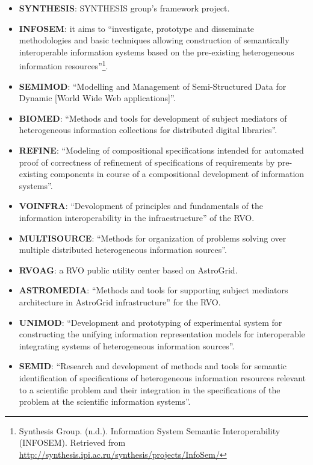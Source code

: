 \begin{itemize}
\item \textbf{SYNTHESIS}:
SYNTHESIS group's framework project.

\item \textbf{INFOSEM}:
it aims to ``investigate, prototype and disseminate methodologies and basic
techniques allowing construction of semantically interoperable information
systems based on the pre-existing heterogeneous information
resources''\footnote{Synthesis Group. (n.d.). Information System Semantic
Interoperability (INFOSEM). Retrieved from
\url{http://synthesis.ipi.ac.ru/synthesis/projects/InfoSem/}}.

\item \textbf{SEMIMOD}:
``Modelling and Management of Semi-Structured Data for Dynamic [World Wide Web
applications]''.

\item \textbf{BIOMED}:
``Methods and tools for development of subject mediators of
he\-te\-ro\-ge\-neous information collections for distributed digital
libraries''.

\item \textbf{REFINE}:
``Modeling of compositional specifications intended for automated proof of
correctness of refinement of specifications of requirements by pre-existing
components in course of a compositional development of information systems''.

\item \textbf{VOINFRA}:
``Devolopment of principles and fundamentals of the information interoperability
in the infraestructure'' of the RVO.

\item \textbf{MULTISOURCE}:
``Methods for organization of problems solving over multiple distributed
heterogeneous information sources''.

\item \textbf{RVOAG}:
a RVO public utility center based on AstroGrid.

\item \textbf{ASTROMEDIA}:
``Methods and tools for supporting subject mediators architecture in AstroGrid
infrastructure'' for the RVO.

\item \textbf{UNIMOD}:
``Development and prototyping of experimental system for constructing the
unifying information representation models for interoperable integrating systems
of heterogeneous information sources''.

\item \textbf{SEMID}:
``Research and development of methods and tools for semantic identification of
specifications of heterogeneous information resources relevant to a scientific
problem and their integration in the specifications of the problem at the
scientific information systems''.


\end{itemize}

